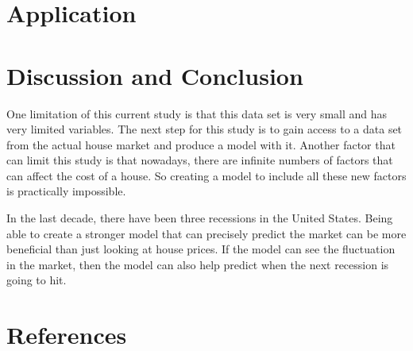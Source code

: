 \documentclass[12pt]{article}
\begin{document}
\section{Application}
\label{sec:app}


\section{Discussion and Conclusion}
\label{sec:disc}

One limitation of this current study is that this data set is very small and has very limited variables. The next step for this study is to gain access to a data set from the actual house market and produce a model with it. Another factor that can limit this study is that nowadays, there are infinite numbers of factors that can affect the cost of a house. So creating a model to include all these new factors is practically impossible. 
\\
\smallskip


In the last decade, there have been three recessions in the United States. Being able to create a stronger model that can precisely predict the market can be more beneficial than just looking at house prices. If the model can see the fluctuation in the market, then the model can also help predict when the next recession is going to hit. 

\section{References}
\label{sec:refer}



\medskip

\printbibliography[title={References}]
\end{document}
